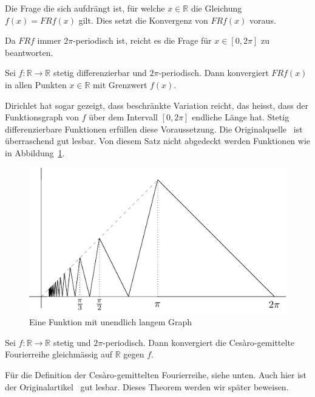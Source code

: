\documentclass[../main.tex]{subfiles}
\begin{document}
Die Frage die sich aufdrängt ist, für welche $x \in \mathbb{R}$ 
die Gleichung $f(x) = FRf(x)$ gilt. Dies setzt die Konvergenz von
$FRf(x)$ voraus.

\begin{remark}
  Da $FRf$ immer $2\pi$-periodisch ist, reicht es die Frage
  für $x \in [0, 2\pi]$ zu beantworten.
\end{remark}

\begin{theorem}[Dirichlet 1829]
  Sei $f \colon \mathbb{R} \to \mathbb{R}$ stetig differenzierbar
  und $2\pi$-periodisch.
  Dann konvergiert $FRf(x)$ in allen Punkten $x \in \mathbb{R}$ 
  mit Grenzwert $f(x)$.
\end{theorem}

Dirichlet hat sogar gezeigt, dass beschränkte Variation reicht,
das heisst, dass der Funktionsgraph von $f$ über dem
Intervall $[0, 2\pi]$ endliche Länge hat.
Stetig differenzierbare Funktionen erfüllen diese Voraussetzung.
Die Originalquelle~\cite{dirichlet} ist überraschend gut
lesbar.
Von diesem Satz nicht abgedeckt werden Funktionen
wie in Abbildung~\ref{fig:long-graph}.

\begin{figure}[htb]
  \centering
  \includegraphics{images/long-graph}
  \caption{Eine Funktion mit unendlich langem Graph}%
  \label{fig:long-graph}
\end{figure}

\begin{theorem}[Fej\'er 1900]\label{thm:fejer}
  Sei $f \colon\mathbb{R} \to \mathbb{R}$ 
  stetig und $2 \pi$-periodisch.
  Dann konvergiert die Cesàro-gemittelte
  Fourierreihe
  gleichmässig auf $\mathbb{R}$ gegen $f$.
\end{theorem}

Für die Definition der Cesàro-gemittelten
Fourierreihe, siehe unten.
Auch hier ist der Originalartikel~\cite{fejer} gut lesbar.
Dieses Theorem werden wir später beweisen.
\end{document}
